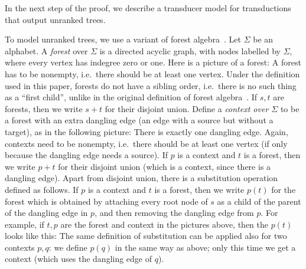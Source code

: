  In the next step of the proof, we describe a transducer model for \mso transductions that output unranked trees. 

To model unranked trees, we  use a variant of forest algebra~\cite{bojanczykForestAlgebras2008}.
 Let $\Sigma$ be an alphabet. A \emph{forest} over $\Sigma$ is a directed acyclic graph, with nodes labelled by $\Sigma$, where every vertex has indegree zero or one.  Here is a picture of a forest:
A forest has to be nonempty, i.e.~there should be at least one vertex.
Under the definition used in this paper, forests do not have a sibling order, i.e.~there is no such thing as a ``first child'', unlike in the original definition of forest algebra~\cite[Section 3]{bojanczykForestAlgebras2008}.
If $s,t$ are forests, then we write $s+t$ for their disjoint union. Define a \emph{context over $\Sigma$} to be a forest with an extra dangling edge (an edge with a source but without a target), as in the following picture:
There is exactly one dangling edge. Again, contexts need to be nonempty, i.e.~there should be at least one vertex (if only because the dangling edge needs a source).
If $p$ is a context and $t$ is a forest, then we write $p+t$ for their disjoint union (which is a context, since there is a dangling edge). Apart from disjoint union, there is a substitution operation defined as follows. If $p$ is a context and $t$ is a forest, then we write $p(t)$ for the forest which is obtained by attaching every root node of $s$ as a child of the parent of the dangling edge in $p$, and then removing the dangling edge from $p$. For example, if $t,p$ are the forest and context in the pictures above, then the $p(t)$ looks like this:
The same definition of substitution can be applied also for two contexts $p,q$: we define $p(q)$ in the same way as above; only this time we get a context (which uses the dangling edge of $q$).


